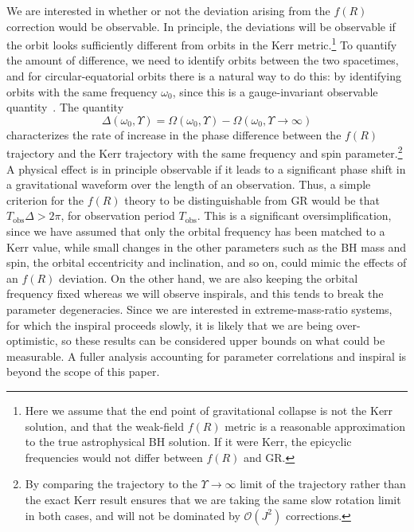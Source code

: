\documentclass[aps,prd,amsfonts,amssymb,amsmath,nofootinbib,reprint,showpacs]{revtex4-1}
\newcommand{\sub}[1]{\ensuremath{_\text{#1}}}
\newcommand{\order}[1]{\ensuremath{\mathcal{O}({#1})}}
\begin{document}
We are interested in whether or not the deviation arising from the $f(R)$ correction would be observable. In principle, the deviations will be observable if the orbit looks sufficiently different from orbits in the Kerr metric.\footnote{Here we assume that the end point of gravitational collapse is not the Kerr solution, and that the weak-field $f(R)$ metric is a reasonable approximation to the true astrophysical BH solution. If it were Kerr, the epicyclic frequencies would not differ between $f(R)$ and GR.} To quantify the amount of difference, we need to identify orbits between the two spacetimes, and for circular-equatorial orbits there is a natural way to do this: by identifying orbits with the same frequency $\omega_0$, since this is a gauge-invariant observable quantity~\cite{Detweiler2008}. The quantity
\begin{equation}
\Delta(\omega_0,\Upsilon) = \Omega(\omega_0,\Upsilon)-\Omega(\omega_0,\Upsilon \rightarrow \infty)
\end{equation}
characterizes the rate of increase in the phase difference between the $f(R)$ trajectory and the Kerr trajectory with the same frequency and spin parameter.\footnote{By comparing the trajectory to the $\Upsilon \rightarrow\infty$ limit of the trajectory rather than the exact Kerr result ensures that we are taking the same slow rotation limit in both cases, and will not be dominated by $\order{J^2}$ corrections.} A physical effect is in principle observable if it leads to a significant phase shift in a gravitational waveform over the length of an observation. Thus, a simple criterion for the $f(R)$ theory to be distinguishable from GR would be that $T\sub{obs}\Delta > 2\pi$, for observation period $T\sub{obs}$. This is a significant oversimplification, since we have assumed that only the orbital frequency has been matched to a Kerr value, while small changes in the other parameters such as the BH mass and spin, the orbital eccentricity and inclination, and so on, could mimic the effects of an $f(R)$ deviation. On the other hand, we are also keeping the orbital frequency fixed whereas we will observe inspirals, and this tends to break the parameter degeneracies. Since we are interested in extreme-mass-ratio systems, for which the inspiral proceeds slowly, it is likely that we are being over-optimistic, so these results can be considered upper bounds on what could be measurable. A fuller analysis accounting for parameter correlations and inspiral is beyond the scope of this paper.
\end{document}
